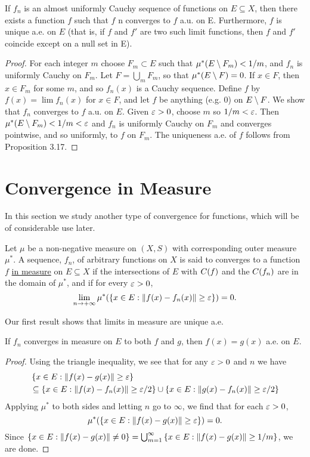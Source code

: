 \begin{proposition}
If $f_n$ is an almost uniformly Cauchy sequence of functions on $E \subseteq X$, then there exists a function $f$ such that $f$ n converges to $f$ a.u. on E. Furthermore, $f$ is unique a.e. on $E$ (that is, if $f$ and $f'$ are two such limit functions, then $f$ and $f'$ coincide except on a null set in E).
\end{proposition}

\begin{proof}
For each integer $m$ choose $F_m\subset E$ such that $\mu^*(E\setminus F_m)<1/m$, and $f_n$ is uniformly Cauchy on $F_m$. Let $F=\bigcup_mF_m$, so that $\mu^*(E\setminus F)=0$. If $x \in F$, then $x \in F_m$ for some $m$, and so $f_n(x)$ is a Cauchy sequence. Define $f$ by $f(x)=\lim f_n(x)$ for $x \in F$, and let $f$ be anything (e.g. 0) on $E\setminus F$. We show that $f_n$ converges to $f$ a.u. on $E$. Given $\varepsilon>0$, choose $m$ so $1/m<\varepsilon$. Then $\mu^*(E\setminus F_m)<1/m<\varepsilon$ and $f_n$ is uniformly Cauchy on $F_m$ and converges pointwise, and so uniformly, to $f$ on $F_m$. The uniqueness a.e. of $f$ follows from Proposition 3.17.
\end{proof}

\section{Convergence in Measure}

In this section we study another type of convergence for functions, which will be of considerable use later.
\begin{definition}
Let $\mu$ be a non-negative measure on $(X,S)$ with corresponding outer measure $\mu^*$. A sequence, $f_n$, of arbitrary functions on $X$ is said to converges to a function $f$ \underline{in measure} on $E\subseteq X$ if the intersections of $E$ with $C(f)$ and the $C(f_n)$ are in the domain of $\mu^*$, and if for every $\varepsilon>0$, $$\lim_{n\to+\infty}\mu^*(\left\{x\in E:\norm{f(x)-f_n(x)}\geq\varepsilon\right\})=0.$$
\end{definition}

Our first result shows that limits in measure are unique a.e.

\begin{proposition}
If $f_n$ converges in measure on $E$ to both $f$ and $g$, then $f(x)=g(x)$ a.e. on $E$.
\end{proposition}

\begin{proof}
Using the triangle inequality, we see that for any $\varepsilon>0$ and $n$ we have
\begin{align*}
&\left\{x \in E:\norm{f(x)-g(x)} \geq \varepsilon\right\} \\
&\subseteq\left\{x \in E:\norm{f(x)-f_n(x)} \geq \varepsilon/2\right\} \cup\left\{x \in E:\norm{g(x)-f_n(x)} \geq \varepsilon/2\right\}
\end{align*}
Applying $\mu^*$ to both sides and letting $n$ go to $\infty$, we find that for each $\varepsilon>0$, $$\mu^*(\left\{x\in E:\norm{f(x)-g(x)}\geq\varepsilon\right\})=0.$$ Since $\left\{x\in E:\norm{f(x)-g(x)}\neq0\right\}=\bigcup_{m=1}^\infty\left\{x\in E:\norm{f(x)-g(x)}\geq1/m\right\}$, we are done.
\end{proof}

